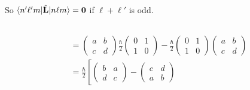 \documentclass{article}
\renewcommand{\vec}[1]{\boldsymbol{\mathbf{#1}}}
\newcommand{\uvec}[1]{\hat{\vec{#1}}}
\begin{document}
So $\braket{n' \ell' m | \uvec{L} | n \ell m} = \vec{0}$ if $\ell + \ell'$ is odd.

\subsection{}

\begin{align*}
  [\hat{\Pi}, \hat{S}_x] & = \begin{pmatrix}
                               a & b \\
                               c & d
                             \end{pmatrix} \frac{\hbar}{2} \begin{pmatrix}
                                                             0 & 1 \\
                                                             1 & 0
                                                           \end{pmatrix} - \frac{\hbar}{2} \begin{pmatrix}
                                                                                             0 & 1 \\
                                                                                             1 & 0
                                                                                           \end{pmatrix} \begin{pmatrix}
                                                                                                           a & b \\
                                                                                                           c & d
                                                                                                         \end{pmatrix}     \\
                         & = \frac{\hbar}{2} \left[ \begin{pmatrix}
                                                        b & a \\
                                                        d & c
                                                      \end{pmatrix} - \begin{pmatrix}
                                                                        c & d \\
                                                                        a & b

\end{pmatrix}
\end{align*}
\end{document}
